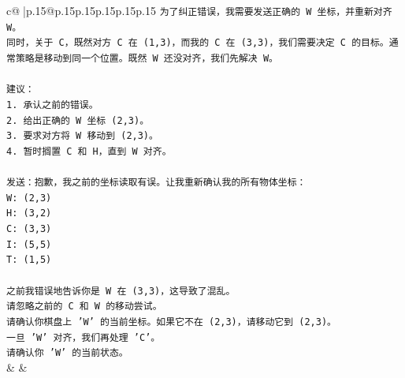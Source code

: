 \documentclass{article}
\begin{document}
{\begin{supertabular}{c@{$\;$}|p{.15\linewidth}@{}p{.15\linewidth}p{.15\linewidth}p{.15\linewidth}p{.15\linewidth}p{.15\linewidth}}
{{{\texttt{为了纠正错误，我需要发送正确的 W 坐标，并重新对齐 W。} \\
\texttt{同时，关于 C，既然对方 C 在 (1,3)，而我的 C 在 (3,3)，我们需要决定 C 的目标。通常策略是移动到同一个位置。既然 W 还没对齐，我们先解决 W。} \\
\\ 
\texttt{建议：} \\
\texttt{1. 承认之前的错误。} \\
\texttt{2. 给出正确的 W 坐标 (2,3)。} \\
\texttt{3. 要求对方将 W 移动到 (2,3)。} \\
\texttt{4. 暂时搁置 C 和 H，直到 W 对齐。} \\
\\ 
\texttt{发送：抱歉，我之前的坐标读取有误。让我重新确认我的所有物体坐标：} \\
\texttt{W: (2,3)} \\
\texttt{H: (3,2)} \\
\texttt{C: (3,3)} \\
\texttt{I: (5,5)} \\
\texttt{T: (1,5)} \\
\\ 
\texttt{之前我错误地告诉你是 W 在 (3,3)，这导致了混乱。} \\
\texttt{请忽略之前的 C 和 W 的移动尝试。} \\
\texttt{请确认你棋盘上 'W' 的当前坐标。如果它不在 (2,3)，请移动它到 (2,3)。} \\
\texttt{一旦 'W' 对齐，我们再处理 'C'。} \\
\texttt{请确认你 'W' 的当前状态。} \\
            }
        }
    }
    & & \\ \\


\end{supertabular}}
\end{document}
